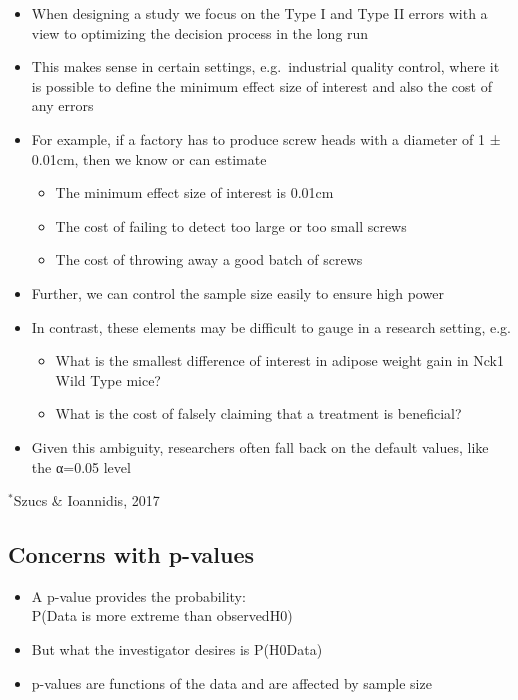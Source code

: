 \documentclass[
]{book}
\providecommand{\tightlist}{%
  \setlength{\itemsep}{0pt}\setlength{\parskip}{0pt}}
\begin{document}
\begin{itemize}
\tightlist
\item
  When designing a study we focus on the Type I and Type II errors with a view to optimizing the decision process in the long run
\item
  This makes sense in certain settings, e.g.~industrial quality control, where it is possible to define the minimum effect size of interest and also the cost of any errors
\item
  For example, if a factory has to produce screw heads with a diameter of 1 ± 0.01cm, then we know or can estimate

  \begin{itemize}
  \tightlist
  \item
    The minimum effect size of interest is 0.01cm
  \item
    The cost of failing to detect too large or too small screws
  \item
    The cost of throwing away a good batch of screws
  \end{itemize}
\item
  Further, we can control the sample size easily to ensure high power
\item
  In contrast, these elements may be difficult to gauge in a research setting, e.g.

  \begin{itemize}
  \tightlist
  \item
    What is the smallest difference of interest in adipose weight gain in Nck1 Wild Type mice?
  \item
    What is the cost of falsely claiming that a treatment is beneficial?
  \end{itemize}
\item
  Given this ambiguity, researchers often fall back on the default values, like the α=0.05 level
\end{itemize}

\(^*\)Szucs \& Ioannidis, 2017

\hypertarget{concerns-with-p-values}{%
\subsection{Concerns with p-values}\label{concerns-with-p-values}}

\begin{itemize}
\tightlist
\item
  A p-value provides the probability:\\
  P(Data is more extreme than observed\textbar H0)
\item
  But what the investigator desires is P(H0\textbar Data)
\item
  p-values are functions of the data and are affected by sample size
\end{itemize}
\end{document}
